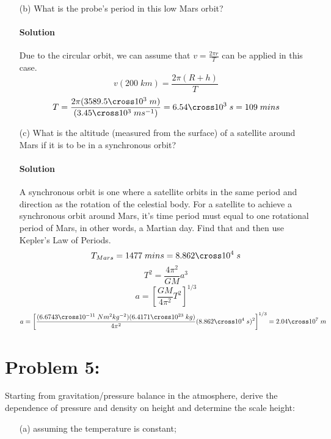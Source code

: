 \documentclass{article}
\begin{document}
{\begin{enumerate}
		\paragraph{Solution} It is fairly easy to derive the formula for the orbital velocity of a satellite. \unboldmath
		\[
			F_g = a_c
		\]
		\[
			\frac{GMm}{(R + h)^2} = \frac{mv^2}{(R + h)}
		\]
		\[
			v = \sqrt{\frac{GM}{(R + h)}}
		\]
		\[
			v(200 \; km) = \sqrt{\frac{(6.6743 \cross 10^{-11} \; Nm^2kg^{-2})(6.4171 \cross 10^{23} \; kg)}{((3389.5 \cross 10^3 \; m) + (200 \cross 10^3 \; m))}} = 3.45 \cross 10^3 \; m s^{-1}
		\]
		\boldmath
		\item[(b)] What is the probe’s period in this low Mars orbit?
		\paragraph{Solution} Due to the circular orbit, we can assume that $v = \frac{2\pi r}{T}$ can be applied in this case. \unboldmath
		\[
			v(200 \; km) = \frac{2 \pi (R + h)}{T}
		\]
		\[
			T = \frac{2 \pi (3589.5 \cross 10^3 \; m)}{(3.45 \cross 10^3 \; m s^{-1})} = 6.54 \cross 10^3 \; s = 109 \; mins
		\]
		\clearpage
		\boldmath
		\item[(c)] What is the altitude (measured from the surface) of a satellite around Mars if it is to be in a synchronous orbit? 
		\paragraph{Solution} A synchronous orbit is one where a satellite orbits in the same period and direction as the rotation of the celestial body. For a satellite to achieve a synchronous orbit around Mars, it's time period must equal to one rotational period of Mars, in other words, a Martian day. Find that and then use Kepler's Law of Periods.  \unboldmath
		\[
			T_{Mars} = 1477 \; mins = 8.862 \cross 10^4 \; s
		\]
		\[
			T^2 = \frac{4\pi^2}{GM} a^3
		\]
		\[
			a = \left[\frac{GM}{4\pi^2} T^2\right]^{1/3}
		\]
		\[
			a = \left[\frac{(6.6743 \cross 10^{-11} \; Nm^2kg^{-2})(6.4171 \cross 10^{23} \; kg)}{4\pi^2} (8.862 \cross 10^4 \; s)^2\right]^{1/3} = 2.04 \cross 10^7 \; m
		\]
	
		
	\end{enumerate}
	
	\section*{Problem 5: }
	\boldmath
	Starting from gravitation/pressure balance in the atmosphere, derive the dependence of pressure and density on height and determine the scale height: \\
	\begin{enumerate}
		\item[(a)] assuming the temperature is constant;

\end{enumerate}}
\end{document}
